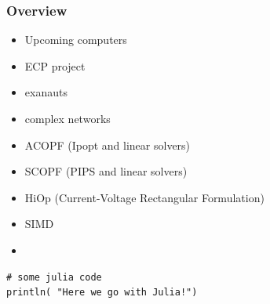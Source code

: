 \begin{frame}[fragile]
  \frametitle{Overview}
  \begin{itemize}
    \item Upcoming computers
    \item ECP project
    \item exanauts
    \item complex networks
    \item ACOPF (Ipopt and linear solvers)
    \item SCOPF (PIPS and linear solvers)
    \item HiOp (Current-Voltage Rectangular Formulation)
    \item SIMD
    \item 


  \end{itemize}
  \begin{lstlisting}
# some julia code
println( "Here we go with Julia!")
\end{lstlisting}
\end{frame}
